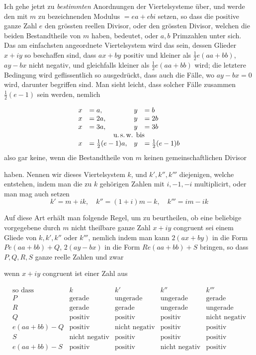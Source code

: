 Ich gehe jetzt zu \emph{bestimmten} Anordnungen der Viertelsysteme über, und werde den mit $m$ zu bezeichnenden Modulus $=ea+ebi$ setzen, so dass die positive ganze Zahl $e$ den grössten reellen Divisor, oder den grössten Divisor, welchen die beiden Bestandtheile von $m$ haben, bedeutet, oder $a,b$ Primzahlen unter sich. Das am einfachsten angeordnete Viertelsystem wird das sein, dessen Glieder $x+iy$ so beschaffen sind, dass $ax+by$ positiv und kleiner als $\frac12e(aa+bb)$, $ay-bx$ nicht negativ, und gleichfalls kleiner als $\frac12e(aa+bb)$ wird; die letztere Bedingung wird geflissentlich so ausgedrückt, dass auch die Fälle, wo $ay-bx=0$ wird, darunter begriffen sind. Man sieht leicht, dass solcher Fälle zusammen $\frac12(e-1)$ sein werden, nemlich

\[
\begin{array}{rlrl}
x&=a,&y&=b\\
x&=2a,&y&=2b\\
x&=3a,&y&=3b\\
\multicolumn{4}{c}{\text{u.\,s.\,w. bis}}\\
x&=\frac12(e-1)a,&y&=\frac12(e-1)b
\end{array}
\]
also gar keine, wenn die Bestandtheile von $m$ keinen gemeinschaftlichen Divisor 

haben. Nennen wir dieses Viertelsystem $k$, und $k',k'',k'''$ diejenigen, welche entstehen, indem man die zu $k$ gehörigen Zahlen mit $i,-1,-i$ multiplicirt, oder man mag auch setzen
\[
k'=m+ik,\quad k''=(1+i)m-k,\quad k'''=im-ik
\]

Auf diese Art erhält man folgende Regel, um zu beurtheilen, ob eine beliebige vorgegebene durch $m$ nicht theilbare ganze Zahl $x+iy$ congruent sei einem Gliede von $k,k',k''$ oder $k'''$, nemlich indem man kann $2(ax+by)$ in die Form $Pe(aa+bb)+Q$, $2(ay-bx)$ in die Form $Re(aa+bb)+S$ bringen, so dass $P,Q,R,S$ ganze reelle Zahlen und zwar

\begin{center}wenn $x+iy$ congruent ist einer Zahl aus\end{center}
\begingroup\small\setlength{\arraycolsep}{3pt}
\[
\begin{array}{l||l|l|l|l}
\text{so dass}&k&k'&k''&k'''\\
P&\text{gerade}&\text{ungerade}&\text{ungerade}&\text{gerade}\\
R&\text{gerade}&\text{gerade}&\text{ungerade}&\text{ungerade}\\
Q&\text{positiv}&\text{positiv}&\text{positiv}&\text{nicht negativ}\\
e(aa+bb)-Q&\text{positiv}&\text{nicht negativ}&\text{positiv}&\text{positiv}\\
S&\text{nicht negativ}&\text{positiv}&\text{positiv}&\text{positiv}\\
e(aa+bb)-S&\text{positiv}&\text{positiv}&\text{nicht negativ}&\text{positiv}
\end{array}
\]
\endgroup

